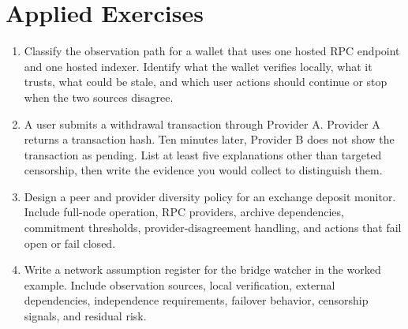 \section*{Applied Exercises}

\begin{enumerate}
\item Classify the observation path for a wallet that uses one hosted RPC endpoint and one hosted indexer. Identify what the wallet verifies locally, what it trusts, what could be stale, and which user actions should continue or stop when the two sources disagree.

\item A user submits a withdrawal transaction through Provider A. Provider A returns a transaction hash. Ten minutes later, Provider B does not show the transaction as pending. List at least five explanations other than targeted censorship, then write the evidence you would collect to distinguish them.

\item Design a peer and provider diversity policy for an exchange deposit monitor. Include full-node operation, RPC providers, archive dependencies, commitment thresholds, provider-disagreement handling, and actions that fail open or fail closed.

\item Write a network assumption register for the bridge watcher in the worked example. Include observation sources, local verification, external dependencies, independence requirements, failover behavior, censorship signals, and residual risk.
\end{enumerate}
